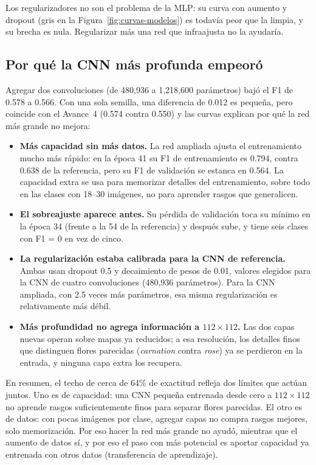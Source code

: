 Los regularizadores no son el problema de la MLP: su curva con aumento y dropout
(gris en la Figura~\ref{fig:curvas-modelos}) es todavía peor que la limpia, y su
brecha es nula. Regularizar más una red que infraajusta no la ayudaría.

\subsection{Por qué la CNN más profunda empeoró}

Agregar dos convoluciones (de 480,936 a 1,218,600 parámetros) bajó el F1 de
0.578 a 0.566. Con una sola semilla, una diferencia de 0.012 es pequeña, pero
coincide con el Avance~4 (0.574 contra 0.550) y las curvas explican por qué la
red más grande no mejora:

\begin{itemize}
\item \textbf{Más capacidad sin más datos.} La red ampliada ajusta el
entrenamiento mucho más rápido: en la época 41 su F1 de entrenamiento es 0.794,
contra 0.638 de la referencia, pero su F1 de validación se estanca en 0.564. La
capacidad extra se usa para memorizar detalles del entrenamiento, sobre todo en
las clases con 18--30 imágenes, no para aprender rasgos que generalicen.
\item \textbf{El sobreajuste aparece antes.} Su pérdida de validación toca su
mínimo en la época 34 (frente a la 54 de la referencia) y después sube, y tiene
seis clases con F1 = 0 en vez de cinco.
\item \textbf{La regularización estaba calibrada para la CNN de referencia.}
Ambas usan dropout 0.5 y decaimiento de pesos de 0.01, valores elegidos para la
CNN de cuatro convoluciones (480,936 parámetros). Para la CNN ampliada, con 2.5
veces más parámetros, esa misma regularización es relativamente más débil.
\item \textbf{Más profundidad no agrega información a $112\times112$.} Las dos
capas nuevas operan sobre mapas ya reducidos; a esa resolución, los detalles
finos que distinguen flores parecidas (\emph{carnation} contra \emph{rose}) ya se
perdieron en la entrada, y ninguna capa extra los recupera.
\end{itemize}

En resumen, el techo de cerca de 64\% de exactitud refleja dos límites que
actúan juntos. Uno es de capacidad: una CNN pequeña entrenada desde cero a
$112\times112$ no aprende rasgos suficientemente finos para separar flores
parecidas. El otro es de datos: con pocas imágenes por clase, agregar capas no
compra rasgos mejores, solo memorización. Por eso hacer la red más grande no
ayudó, mientras que el aumento de datos sí, y por eso el paso con más potencial
es aportar capacidad ya entrenada con otros datos (transferencia de
aprendizaje).

